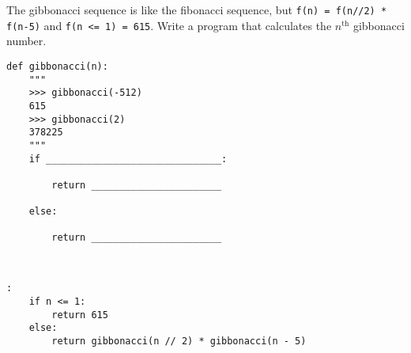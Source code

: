 \begin{blocksection}
\question The gibbonacci sequence is like the fibonacci sequence, but \texttt{f(n) = f(n//2) * f(n-5)} and \texttt{f(n <= 1) = 615}. Write a program that calculates the $n^{\text{th}}$ gibbonacci number. \\

\begin{lstlisting}
def gibbonacci(n):
    """
    >>> gibbonacci(-512)
    615
    >>> gibbonacci(2)
    378225
    """
    if _______________________________:

        return _______________________	

    else:

        return _______________________

				
\end{lstlisting}

\begin{solution}[1in]
\begin{lstlisting}:
    if n <= 1:
        return 615
    else:
        return gibbonacci(n // 2) * gibbonacci(n - 5)
\end{lstlisting}
\end{solution}
\end{blocksection}
